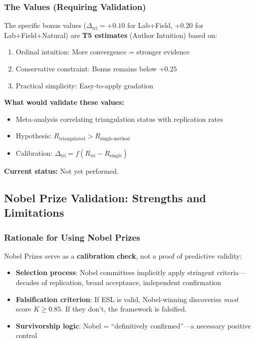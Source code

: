 \documentclass[11pt,a4paper]{article}
\begin{document}
\subsubsection{The Values (Requiring Validation)}

The specific bonus values ($\Delta_{\text{tri}} = +0.10$ for Lab+Field, $+0.20$ for Lab+Field+Natural) are \textbf{T5 estimates} (Author Intuition) based on:
\begin{enumerate}
    \item Ordinal intuition: More convergence = stronger evidence
    \item Conservative constraint: Bonus remains below $+0.25$
    \item Practical simplicity: Easy-to-apply gradation
\end{enumerate}

\begin{warningbox}[title={Required Validation for Triangulation Values}]
\textbf{What would validate these values:}
\begin{itemize}
    \item Meta-analysis correlating triangulation status with replication rates
    \item Hypothesis: $R_{\text{triangulated}} > R_{\text{single-method}}$
    \item Calibration: $\Delta_{\text{tri}} = f(R_{\text{tri}} - R_{\text{single}})$
\end{itemize}
\textbf{Current status:} Not yet performed.
\end{warningbox}

\subsection{Nobel Prize Validation: Strengths and Limitations}

\subsubsection{Rationale for Using Nobel Prizes}

Nobel Prizes serve as a \textbf{calibration check}, not a proof of predictive validity:

\begin{itemize}
    \item \textbf{Selection process}: Nobel committees implicitly apply stringent criteria---decades of replication, broad acceptance, independent confirmation
    \item \textbf{Falsification criterion}: If ESL is valid, Nobel-winning discoveries \textit{must} score $K \geq 0.85$. If they don't, the framework is falsified.
    \item \textbf{Survivorship logic}: Nobel = ``definitively confirmed''---a necessary positive control
\end{itemize}
\end{document}
